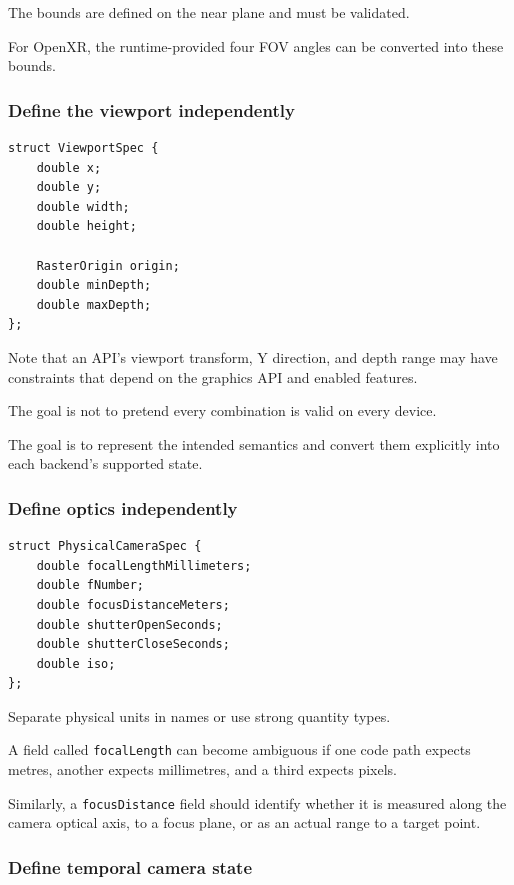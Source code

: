 The bounds are defined on the near plane and must be validated.

For OpenXR, the runtime-provided four FOV angles can be converted into these bounds.

\subsubsection{Define the viewport independently}\label{define-the-viewport-independently}

\begin{verbatim}
struct ViewportSpec {
    double x;
    double y;
    double width;
    double height;

    RasterOrigin origin;
    double minDepth;
    double maxDepth;
};
\end{verbatim}

Note that an API's viewport transform, Y direction, and depth range may have constraints that depend on the graphics API and enabled features.

The goal is not to pretend every combination is valid on every device.

The goal is to represent the intended semantics and convert them explicitly into each backend's supported state.

\subsubsection{Define optics independently}\label{define-optics-independently}

\begin{verbatim}
struct PhysicalCameraSpec {
    double focalLengthMillimeters;
    double fNumber;
    double focusDistanceMeters;
    double shutterOpenSeconds;
    double shutterCloseSeconds;
    double iso;
};
\end{verbatim}

Separate physical units in names or use strong quantity types.

A field called \texttt{focalLength} can become ambiguous if one code path expects metres, another expects millimetres, and a third expects pixels.

Similarly, a \texttt{focusDistance} field should identify whether it is measured along the camera optical axis, to a focus plane, or as an actual range to a target point.

\subsubsection{Define temporal camera state}\label{define-temporal-camera-state}

